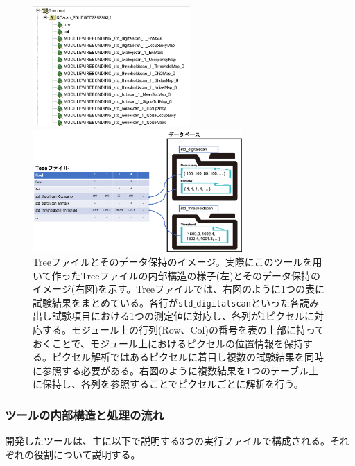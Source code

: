 \begin{figure}[bpt]
  \begin{minipage}{0.4\hsize}
    \begin{center}
    \includegraphics[width=6cm]{./analysis_tool_tree_file.png}
    \end{center}
  \end{minipage}
  \begin{minipage}{0.4\hsize}
    \begin{center}
    \includegraphics[width=8cm]{./analysis_tool_tree_image.png}
    \end{center}
  \end{minipage}
  \caption[Treeファイルとそのデータ保持のイメージ]{Treeファイルとそのデータ保持のイメージ。実際にこのツールを用いて作ったTreeファイルの内部構造の様子(左)とそのデータ保持のイメージ(右図)を示す。Treeファイルでは、右図のように1つの表に試験結果をまとめている。各行が\texttt{std$\_$digitalscan}といった各読み出し試験項目における1つの測定値に対応し、各列が1ピクセルに対応する。モジュール上の行列(Row、Col)の番号を表の上部に持っておくことで、モジュール上におけるピクセルの位置情報を保持する。ピクセル解析ではあるピクセルに着目し複数の試験結果を同時に参照する必要がある。右図のように複数結果を1つのテーブル上に保持し、各列を参照することでピクセルごとに解析を行う。}
  \label{analysis_tool_tree}
\end{figure}

\subsubsection{ツールの内部構造と処理の流れ}
開発したツールは、主に以下で説明する3つの実行ファイルで構成される。それぞれの役割について説明する。

